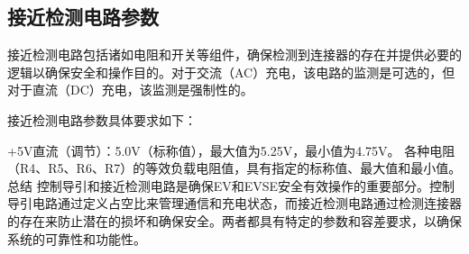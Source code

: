 \subsection{接近检测电路参数 }
接近检测电路包括诸如电阻和开关等组件，确保检测到连接器的存在并提供必要的逻辑以确保安全和操作目的。对于交流（AC）充电，该电路的监测是可选的，但对于直流（DC）充电，该监测是强制性的。

接近检测电路参数具体要求如下：

+5V直流（调节）：5.0V（标称值），最大值为5.25V，最小值为4.75V。
各种电阻（R4、R5、R6、R7）的等效负载电阻值，具有指定的标称值、最大值和最小值。
总结
控制导引和接近检测电路是确保EV和EVSE安全有效操作的重要部分。控制导引电路通过定义占空比来管理通信和充电状态，而接近检测电路通过检测连接器的存在来防止潜在的损坏和确保安全。两者都具有特定的参数和容差要求，以确保系统的可靠性和功能性。








